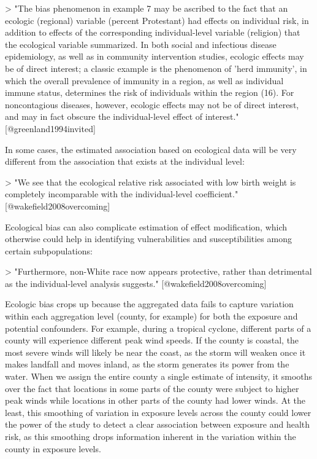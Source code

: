 > "The bias phenomenon in example 7 may be ascribed to the fact that an 
ecologic (regional) variable (percent Protestant) had effects on individual 
risk, in addition to effects of the corresponding individual-level variable
(religion) that the ecological variable summarized. In both social and 
infectious disease epidemiology, as well as in community intervention studies, 
ecologic effects may be of direct interest; a classic example is the 
phenomenon of 'herd immunity', in which the overall prevalence of 
immunity in a region, as well as individual immune status, determines the 
risk of individuals within the region (16). For noncontagious diseases, 
however, ecologic effects may not be of direct interest, and may in fact
obscure the individual-level effect of interest." [@greenland1994invited]

In some cases, the estimated association based on ecological data will be very 
different from the association that exists at the individual level: 

> "We see that the ecological relative risk associated with low birth 
weight is completely incomparable with the individual-level coefficient."
[@wakefield2008overcoming]

Ecological bias can also complicate estimation of effect modification, which 
otherwise could help in identifying vulnerabilities and susceptibilities among
certain subpopulations: 

> "Furthermore, non-White race now appears protective, rather than detrimental
as the individual-level analysis suggests." [@wakefield2008overcoming]

Ecologic bias crops up because the aggregated data fails to capture variation
within each aggregation level (county, for example) for both the exposure 
and potential confounders. For example, during a tropical cyclone, different
parts of a county will experience different peak wind speeds. If the county 
is coastal, the most severe winds will likely be near the coast, as the 
storm will weaken once it makes landfall and moves inland, as the storm 
generates its power from the water. When we assign the entire county a
single estimate of intensity, it smooths over the fact that locations in 
some parts of the county were subject to higher peak winds while locations
in other parts of the county had lower winds. At the least, this smoothing
of variation in exposure levels across the county could lower the power of 
the study to detect a clear association between exposure and health risk, as
this smoothing drops information inherent in the variation within the county
in exposure levels. 

